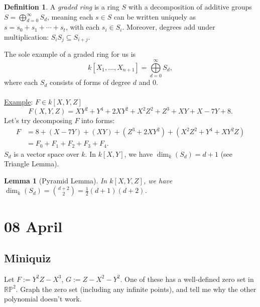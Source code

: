 \documentclass[12pt]{article}
\newcommand{\real}{\mathbb{R}}
\newcommand{\ita}[1]{\textit{#1}}
\newtheorem{lemma}[theorem]{Lemma}
\theoremstyle{definition}
\newtheorem{definition}[theorem]{Definition}
\begin{document}
\begin{definition}
    A \ita{graded ring} is a ring $S$ with a decomposition of additive groups $S=\bigoplus\limits_{d=0}^{\infty}S_d$, meaning each $s\in S$ can be written uniquely as $s=s_0+s_1+\dotsb+s_t$, with each $s_i\in S_i$. Moreover, degrees add under multiplication: $S_iS_j\subseteq S_{i+j}$.
\end{definition}
The sole example of a graded ring for us is
\[k[X_1,\dotsc,X_{n+1}]=\bigoplus\limits_{d=0}^{\infty}S_d,\]
where each $S_d$ consists of forms of degree $d$ and 0.\\\\
\underline{Example}: $F\in k[X,Y,Z]$
\[F(X,Y,Z)=XY^2+Y^4+2XY^2+X^2Z^2+Z^3+XY+X-7Y+8.\]
Let's try decomposing $F$ into forms:
\begin{align*}
    F&=8+(X-7Y)+(XY)+(Z^3+2XY^2)+(X^2Z^2+Y^4+XY^2Z)\\
    &=F_0+F_1+F_2+F_3+F_4.
\end{align*}
$S_d$ is a vector space over $k$. In $k[X,Y]$, we have $\dim_k(S_d)=d+1$ (see Triangle Lemma). \begin{lemma}[Pyramid Lemma]
    In $k[X,Y,Z]$, we have $\dim_k(S_d)=\binom{d+2}{2}=\frac{1}{2}(d+1)(d+2)$.
\end{lemma}
\section{08 April}
\subsection{Miniquiz}
Let $F:=Y^2Z-X^3$, $G:=Z-X^2-Y^2$. One of these has a well-defined zero set in $\real\mathbb{P}^2$. Graph the zero set (including any infinite points), and tell me why the other polynomial doesn't work.
\end{document}
